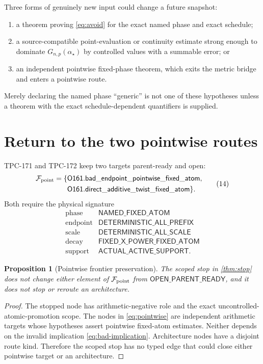\documentclass[11pt]{article}
\newtheorem{proposition}[theorem]{Proposition}
\theoremstyle{definition}
\theoremstyle{remark}
\begin{document}
Three forms of genuinely new input could change a future snapshot:
\begin{enumerate}[label=(\alph*),leftmargin=2.2em]
\item a theorem proving \eqref{eq:avoid} for the exact named phase and
  exact schedule;
\item a source-compatible point-evaluation or continuity estimate
  strong enough to dominate \(G_{n,p}(\alpha_\star)\) by controlled
  values with a summable error; or
\item an independent pointwise fixed-phase theorem, which exits the
  metric bridge and enters a pointwise route.
\end{enumerate}
Merely declaring the named phase ``generic'' is not one of these
hypotheses unless a theorem with the exact schedule-dependent
quantifiers is supplied.

\section{Return to the two pointwise routes}

TPC-171 and TPC-172 keep two targets parent-ready and open:
\[
\begin{split}
\mathcal F_{\rm point}
=\{&
\mathsf{O161.bad\_endpoint\_pointwise\_fixed\_atom},\\
&
\mathsf{O161.direct\_additive\_twist\_fixed\_atom}
\}.
\end{split}
\tag{14}\label{eq:pointwise}
\]
Both require the physical signature
\[
\begin{array}{c|c}
\text{phase}&\mathsf{NAMED\_FIXED\_ATOM}\\
\text{endpoint}&\mathsf{DETERMINISTIC\_ALL\_PREFIX}\\
\text{scale}&\mathsf{DETERMINISTIC\_ALL\_SCALE}\\
\text{decay}&\mathsf{FIXED\_X\_POWER\_FIXED\_ATOM}\\
\text{support}&\mathsf{ACTUAL\_ACTIVE\_SUPPORT}.
\end{array}
\tag{15}\label{eq:pointwise-signature}
\]

\begin{proposition}[Pointwise frontier preservation]
\label{prop:frontier}
The scoped stop in \cref{thm:stop} does not change either element of
\(\mathcal F_{\rm point}\) from
\(\mathsf{OPEN\_PARENT\_READY}\), and it does not stop or reroute an
architecture.
\end{proposition}

\begin{proof}
The stopped node has arithmetic-negative role and the exact
uncontrolled-atomic-promotion scope.
The nodes in \eqref{eq:pointwise} are independent arithmetic targets
whose hypotheses assert pointwise fixed-atom estimates.  Neither
depends on the invalid implication \eqref{eq:bad-implication}.
Architecture nodes have a disjoint route kind.  Therefore the scoped
stop has no typed edge that could close either pointwise target or an
architecture.
\end{proof}
\end{document}
